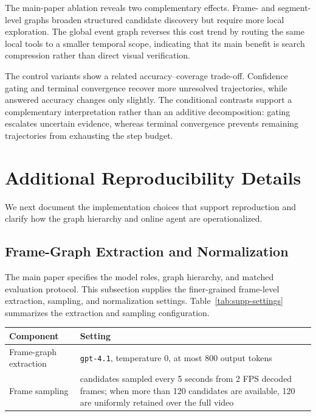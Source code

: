\documentclass[letterpaper]{article}
\begin{document}
The main-paper ablation reveals two complementary effects.
Frame- and segment-level graphs broaden structured candidate discovery but require more local exploration.
The global event graph reverses this cost trend by routing the same local tools to a smaller temporal scope, indicating that its main benefit is search compression rather than direct visual verification.

The control variants show a related accuracy--coverage trade-off.
Confidence gating and terminal convergence recover more unresolved trajectories, while answered accuracy changes only slightly.
The conditional contrasts support a complementary interpretation rather than an additive decomposition: gating escalates uncertain evidence, whereas terminal convergence prevents remaining trajectories from exhausting the step budget.

\section{Additional Reproducibility Details}
\label{sec:supp-reproducibility}

We next document the implementation choices that support reproduction and clarify how the graph hierarchy and online agent are operationalized.

\subsection{Frame-Graph Extraction and Normalization}

The main paper specifies the model roles, graph hierarchy, and matched evaluation protocol.
This subsection supplies the finer-grained frame-level extraction, sampling, and normalization settings.
Table~\ref{tab:supp-settings} summarizes the extraction and sampling configuration.

\begin{center}
  \centering
  \small
  \setlength{\tabcolsep}{4pt}
  \begin{tabularx}{\columnwidth}{@{}lY@{}}
    \toprule
    \textbf{Component} & \textbf{Setting} \\
    \midrule
    Frame-graph extraction &
    \texttt{gpt-4.1}, temperature 0, at most 800 output tokens \\
    Frame sampling &
    candidates sampled every 5 seconds from 2 FPS decoded frames; when more than 120 candidates are available, 120 are uniformly retained over the full video \\
    \bottomrule
  \end{tabularx}
  \label{tab:supp-settings}
\end{center}
\end{document}
